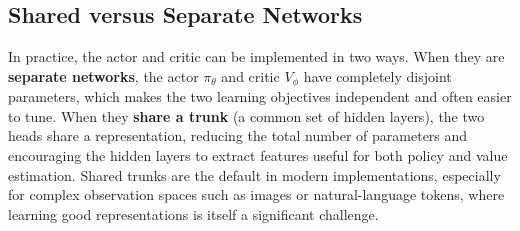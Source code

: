 






\subsection{Shared versus Separate Networks}

In practice, the actor and critic can be implemented in two ways.
When they are \textbf{separate networks}, the actor $\pi_\theta$ and critic
$V_\phi$ have completely disjoint parameters, which makes the two learning
objectives independent and often easier to tune.  When they \textbf{share a
trunk} (a common set of hidden layers), the two heads share a representation,
reducing the total number of parameters and encouraging the hidden layers to
extract features useful for both policy and value estimation.  Shared trunks
are the default in modern implementations, especially for complex observation
spaces such as images or natural-language tokens, where learning good
representations is itself a significant challenge.


